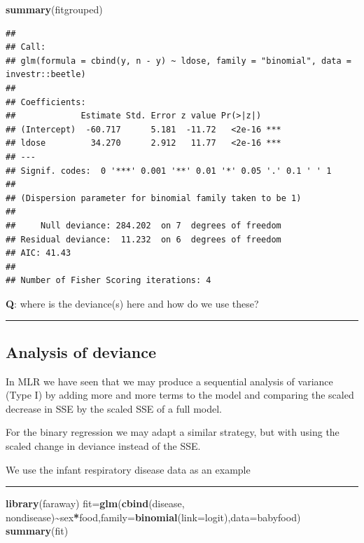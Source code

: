\documentclass[
]{article}
\newenvironment{Shaded}{\begin{snugshade}}{\end{snugshade}}
\newcommand{\AttributeTok}[1]{\textcolor[rgb]{0.13,0.29,0.53}{#1}}
\newcommand{\FunctionTok}[1]{\textcolor[rgb]{0.13,0.29,0.53}{\textbf{#1}}}
\newcommand{\NormalTok}[1]{#1}
\newcommand{\OtherTok}[1]{\textcolor[rgb]{0.56,0.35,0.01}{#1}}
\newcommand{\SpecialCharTok}[1]{\textcolor[rgb]{0.81,0.36,0.00}{\textbf{#1}}}
\begin{document}
\footnotesize

\begin{Shaded}
\begin{Highlighting}[]
\FunctionTok{summary}\NormalTok{(fitgrouped)}
\end{Highlighting}
\end{Shaded}

\begin{verbatim}
## 
## Call:
## glm(formula = cbind(y, n - y) ~ ldose, family = "binomial", data = investr::beetle)
## 
## Coefficients:
##             Estimate Std. Error z value Pr(>|z|)    
## (Intercept)  -60.717      5.181  -11.72   <2e-16 ***
## ldose         34.270      2.912   11.77   <2e-16 ***
## ---
## Signif. codes:  0 '***' 0.001 '**' 0.01 '*' 0.05 '.' 0.1 ' ' 1
## 
## (Dispersion parameter for binomial family taken to be 1)
## 
##     Null deviance: 284.202  on 7  degrees of freedom
## Residual deviance:  11.232  on 6  degrees of freedom
## AIC: 41.43
## 
## Number of Fisher Scoring iterations: 4
\end{verbatim}

\normalsize

\textbf{Q}: where is the deviance(s) here and how do we use these?

\begin{center}\rule{0.5\linewidth}{0.5pt}\end{center}

\hypertarget{analysis-of-deviance}{%
\subsection{Analysis of deviance}\label{analysis-of-deviance}}

In MLR we have seen that we may produce a sequential analysis of
variance (Type I) by adding more and more terms to the model and
comparing the scaled decrease in SSE by the scaled SSE of a full model.

For the binary regression we may adapt a similar strategy, but with
using the scaled change in deviance instead of the SSE.

We use the infant respiratory disease data as an example

\begin{center}\rule{0.5\linewidth}{0.5pt}\end{center}

\footnotesize

\begin{Shaded}
\begin{Highlighting}[]
\FunctionTok{library}\NormalTok{(faraway)}
\NormalTok{fit}\OtherTok{=}\FunctionTok{glm}\NormalTok{(}\FunctionTok{cbind}\NormalTok{(disease, nondisease)}\SpecialCharTok{\textasciitilde{}}\NormalTok{sex}\SpecialCharTok{*}\NormalTok{food,}\AttributeTok{family=}\FunctionTok{binomial}\NormalTok{(}\AttributeTok{link=}\NormalTok{logit),}\AttributeTok{data=}\NormalTok{babyfood)}
\FunctionTok{summary}\NormalTok{(fit)}
\end{Highlighting}
\end{Shaded}
\end{document}
